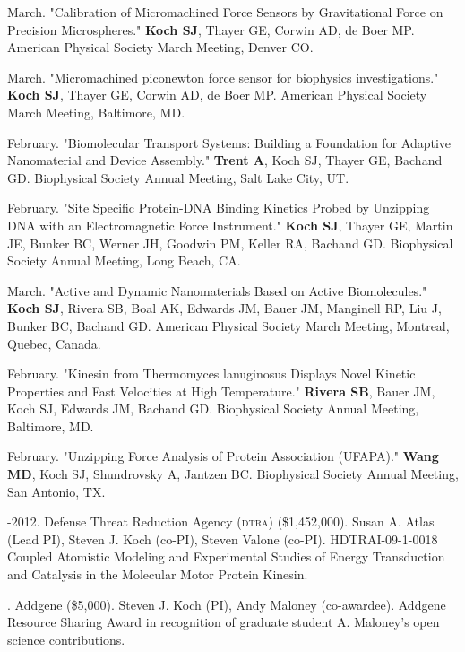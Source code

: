 \documentclass[11pt]{article}
\begin{document}
 March. "Calibration of Micromachined Force Sensors by Gravitational Force on Precision Microspheres." \textbf{Koch SJ}, Thayer GE, Corwin AD, de Boer MP. American Physical Society March Meeting, Denver CO.

 March. "Micromachined piconewton force sensor for biophysics investigations." \textbf{Koch SJ}, Thayer GE, Corwin AD, de Boer MP. American Physical Society March Meeting, Baltimore, MD.

 February. "Biomolecular Transport Systems: Building a Foundation for Adaptive Nanomaterial and Device Assembly." \textbf{Trent A}, Koch SJ, Thayer GE, Bachand GD. Biophysical Society Annual Meeting, Salt Lake City, UT.

 February. "Site Specific Protein-DNA Binding Kinetics Probed by Unzipping DNA with an Electromagnetic Force Instrument." \textbf{Koch SJ}, Thayer GE, Martin JE, Bunker BC, Werner JH, Goodwin PM, Keller RA, Bachand GD. Biophysical Society Annual Meeting, Long Beach, CA.

 March. "Active and Dynamic Nanomaterials Based on Active Biomolecules." \textbf{Koch SJ}, Rivera SB, Boal AK, Edwards JM, Bauer JM, Manginell RP, Liu J, Bunker BC, Bachand GD. American Physical Society March Meeting, Montreal, Quebec, Canada.

 February. "Kinesin from Thermomyces lanuginosus Displays Novel Kinetic Properties and Fast Velocities at High Temperature." \textbf{Rivera SB}, Bauer JM, Koch SJ, Edwards JM, Bachand GD. Biophysical Society Annual Meeting, Baltimore, MD.

 February. "Unzipping Force Analysis of Protein Association (UFAPA)." \textbf{Wang MD}, Koch SJ, Shundrovsky A, Jantzen BC. Biophysical Society Annual Meeting, San Antonio, TX.

\bigskip

\medskip
  
-2012. Defense Threat Reduction Agency (\textsc{dtra}) (\$1,452,000). Susan A. Atlas (Lead PI), Steven J. Koch (co-PI), Steven Valone (co-PI). HDTRAI-09-1-0018 Coupled Atomistic Modeling and Experimental Studies of Energy Transduction and Catalysis in the Molecular Motor Protein Kinesin.

. Addgene (\$5,000). Steven J. Koch (PI), Andy Maloney (co-awardee). Addgene Resource Sharing Award in recognition of graduate student A. Maloney's open science contributions.
\end{document}

